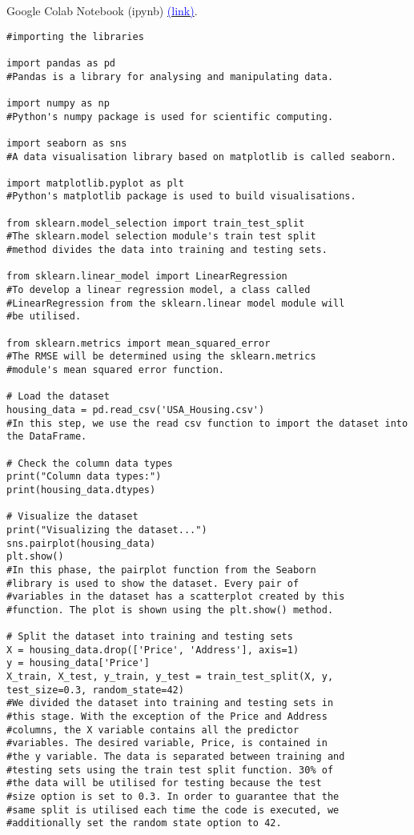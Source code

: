 \documentclass{article}
\begin{document}
Google Colab Notebook (ipynb) \href{https://colab.research.google.com/drive/1LRfhZegwL5-s1jCuh2wH0zb_LphDa4Qa#scrollTo=EG5ced_Z_Bc8&line=1&uniqifier=1}{\textcolor{blue}{(link)}}.
\begin{verbatim}
#importing the libraries

import pandas as pd
#Pandas is a library for analysing and manipulating data.

import numpy as np
#Python's numpy package is used for scientific computing.

import seaborn as sns
#A data visualisation library based on matplotlib is called seaborn.

import matplotlib.pyplot as plt
#Python's matplotlib package is used to build visualisations.

from sklearn.model_selection import train_test_split
#The sklearn.model selection module's train test split
#method divides the data into training and testing sets.

from sklearn.linear_model import LinearRegression
#To develop a linear regression model, a class called
#LinearRegression from the sklearn.linear model module will
#be utilised.

from sklearn.metrics import mean_squared_error
#The RMSE will be determined using the sklearn.metrics
#module's mean squared error function.

# Load the dataset
housing_data = pd.read_csv('USA_Housing.csv')
#In this step, we use the read csv function to import the dataset into the DataFrame.

# Check the column data types
print("Column data types:")
print(housing_data.dtypes)

# Visualize the dataset
print("Visualizing the dataset...")
sns.pairplot(housing_data)
plt.show()
#In this phase, the pairplot function from the Seaborn
#library is used to show the dataset. Every pair of
#variables in the dataset has a scatterplot created by this
#function. The plot is shown using the plt.show() method.

# Split the dataset into training and testing sets
X = housing_data.drop(['Price', 'Address'], axis=1)
y = housing_data['Price']
X_train, X_test, y_train, y_test = train_test_split(X, y, test_size=0.3, random_state=42)
#We divided the dataset into training and testing sets in
#this stage. With the exception of the Price and Address
#columns, the X variable contains all the predictor
#variables. The desired variable, Price, is contained in
#the y variable. The data is separated between training and
#testing sets using the train test split function. 30% of
#the data will be utilised for testing because the test
#size option is set to 0.3. In order to guarantee that the
#same split is utilised each time the code is executed, we
#additionally set the random state option to 42.


\end{verbatim}
\end{document}
